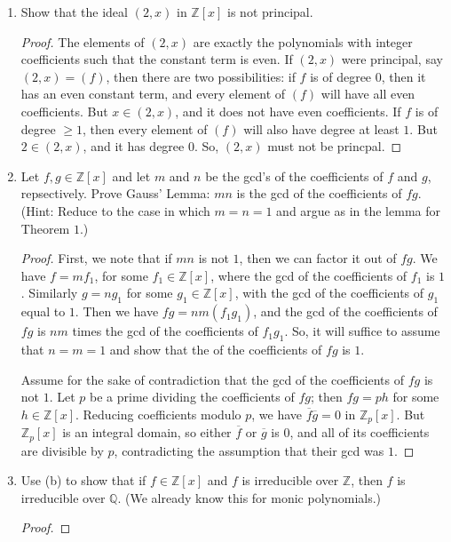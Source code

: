\documentclass[12pt]{article}
\newcommand{\Q}{\mathbb{Q}}
\newcommand{\Z}{\mathbb{Z}}
\theoremstyle{definition}
\newenvironment{problem}[2][Problem]{\begin{trivlist}
\item[\hskip \labelsep {\bfseries #1}\hskip \labelsep {\bfseries #2.}]}{\end{trivlist}}
\begin{document}
\begin{problem}{8}
	\begin{enumerate}[label=(\alph*)]
		\item Show that the ideal $(2, x)$ in $\Z[x]$ is not principal.
			\begin{proof}
				The elements of $(2, x)$ are exactly the polynomials with integer coefficients such that the constant term is even.
				If $(2,x)$ were principal, say $(2, x) = (f)$, then there are two possibilities: if $f$ is of degree $0$, then it has an even constant term, and every element of $(f)$ will have all even coefficients.
				But $x \in (2, x)$, and it does not have even coefficients.
				If $f$ is of degree $\geq 1$, then every element of $(f)$ will also have degree at least $1$.
				But $2 \in (2, x)$, and it has degree $0$. So, $(2, x)$ must not be princpal.
			\end{proof}
		\item Let $f, g \in \Z[x]$ and let $m$ and $n$ be the gcd's of the coefficients of $f$ and $g$, repsectively.
			Prove Gauss' Lemma: $mn$ is the gcd of the coefficients of $fg$. (Hint: Reduce to the case in which $m = n = 1$ and argue as in the lemma for Theorem $1$.)
			\begin{proof}
				First, we note that if $mn$ is not $1$, then we can factor it out of $fg$.
				We have $f = mf_1$, for some $f_1 \in \Z[x]$, where the gcd of the coefficients of $f_1$ is $1$.
				Similarly $g = ng_1$ for some $g_1 \in \Z[x]$, with the gcd of the coefficients of $g_1$ equal to $1$.
				Then we have $fg = nm(f_1g_1)$, and the gcd of the coefficients of $fg$ is $nm$ times the gcd of the coefficients of $f_1g_1$.
				So, it will suffice to assume that $n = m = 1$ and show that the of the coefficients of $fg$ is $1$.
				\par Assume for the sake of contradiction that the gcd of the coefficients of $fg$ is not $1$. 
				Let $p$ be a prime dividing the coefficients of $fg$; then $fg = ph$ for some $h \in \Z[x]$.
				Reducing coefficients modulo $p$, we have $\overline f \overline g = 0$ in $\Z_p[x]$.
				But $\Z_p[x]$ is an integral domain, so either $\overline f$ or $\overline g$ is $0$, and all of its coefficients are divisible by $p$, contradicting the assumption that their gcd was $1$.
			\end{proof}
		\item Use (b) to show that if $f \in \Z[x]$ and $f$ is irreducible over $\Z$, then $f$ is irreducible over $\Q$.
			(We already know this for monic polynomials.)
			\begin{proof}

\end{proof}
\end{enumerate}
\end{problem}
\end{document}
